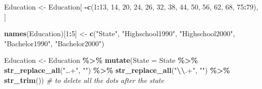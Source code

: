 \documentclass[
]{article}
\newenvironment{Shaded}{\begin{snugshade}}{\end{snugshade}}
\newcommand{\AttributeTok}[1]{\textcolor[rgb]{0.13,0.29,0.53}{#1}}
\newcommand{\CommentTok}[1]{\textcolor[rgb]{0.56,0.35,0.01}{\textit{#1}}}
\newcommand{\DecValTok}[1]{\textcolor[rgb]{0.00,0.00,0.81}{#1}}
\newcommand{\FunctionTok}[1]{\textcolor[rgb]{0.13,0.29,0.53}{\textbf{#1}}}
\newcommand{\NormalTok}[1]{#1}
\newcommand{\OtherTok}[1]{\textcolor[rgb]{0.56,0.35,0.01}{#1}}
\newcommand{\SpecialCharTok}[1]{\textcolor[rgb]{0.81,0.36,0.00}{\textbf{#1}}}
\newcommand{\StringTok}[1]{\textcolor[rgb]{0.31,0.60,0.02}{#1}}
\begin{document}
\begin{Shaded}
\begin{Highlighting}[]
\NormalTok{Education }\OtherTok{\textless{}{-}}\NormalTok{ Education[ }\SpecialCharTok{{-}}\FunctionTok{c}\NormalTok{(}\DecValTok{1}\SpecialCharTok{:}\DecValTok{13}\NormalTok{, }\DecValTok{14}\NormalTok{, }\DecValTok{20}\NormalTok{, }\DecValTok{24}\NormalTok{, }\DecValTok{26}\NormalTok{, }\DecValTok{32}\NormalTok{, }\DecValTok{38}\NormalTok{, }\DecValTok{44}\NormalTok{, }\DecValTok{50}\NormalTok{, }\DecValTok{56}\NormalTok{, }\DecValTok{62}\NormalTok{, }\DecValTok{68}\NormalTok{, }\DecValTok{75}\SpecialCharTok{:}\DecValTok{79}\NormalTok{), ]}
\end{Highlighting}
\end{Shaded}

\begin{Shaded}
\begin{Highlighting}[]
\FunctionTok{names}\NormalTok{(Education)[}\DecValTok{1}\SpecialCharTok{:}\DecValTok{5}\NormalTok{] }\OtherTok{\textless{}{-}} \FunctionTok{c}\NormalTok{(}\StringTok{"State"}\NormalTok{, }\StringTok{"Highschool1990"}\NormalTok{, }\StringTok{"Highschool2000"}\NormalTok{, }\StringTok{"Bachelor1990"}\NormalTok{, }\StringTok{"Bachelor2000"}\NormalTok{)}
\end{Highlighting}
\end{Shaded}

\begin{Shaded}
\begin{Highlighting}[]
\NormalTok{Education }\OtherTok{\textless{}{-}}\NormalTok{ Education }\SpecialCharTok{\%\textgreater{}\%} 
  \FunctionTok{mutate}\NormalTok{(}\AttributeTok{State =}\NormalTok{ State }\SpecialCharTok{\%\textgreater{}\%}
           \FunctionTok{str\_replace\_all}\NormalTok{(}\StringTok{"…+"}\NormalTok{, }\StringTok{""}\NormalTok{) }\SpecialCharTok{\%\textgreater{}\%}
           \FunctionTok{str\_replace\_all}\NormalTok{(}\StringTok{"}\SpecialCharTok{\textbackslash{}\textbackslash{}}\StringTok{.+"}\NormalTok{, }\StringTok{""}\NormalTok{) }\SpecialCharTok{\%\textgreater{}\%}
           \FunctionTok{str\_trim}\NormalTok{()) }\CommentTok{\# to delete all the dots after the state }
\end{Highlighting}
\end{Shaded}
\end{document}
